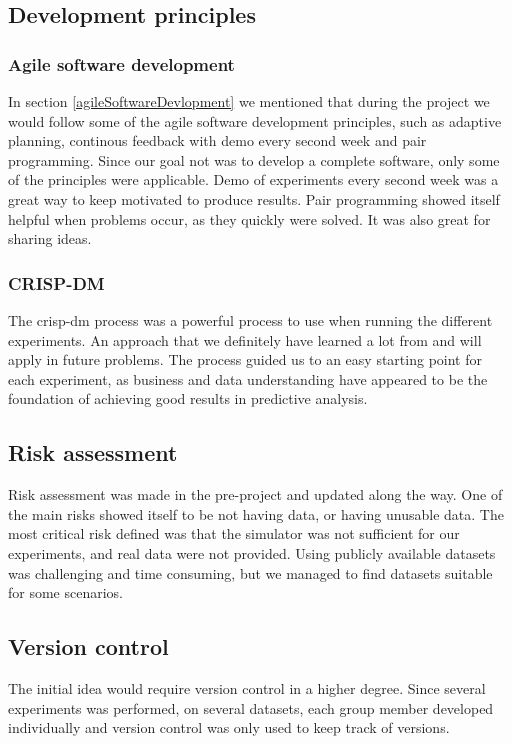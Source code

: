 \documentclass[english, a4paper]{report}
\begin{document}
{{        \subsection{Development principles}
        {
            \subsubsection{Agile software development}
            {
                In section \ref{agileSoftwareDevlopment} we mentioned that during the project we would follow some of the agile software development principles, such as adaptive planning, continous feedback with demo every second week and pair programming. Since our goal not was to develop a complete software, only some of the principles were applicable. Demo of experiments every second week was a great way to keep motivated to produce results. Pair programming showed itself helpful when problems occur, as they quickly were solved. It was also great for sharing ideas. 
            }
            
            \subsubsection{CRISP-DM}
            {
                The \gls{crisp-dm} process was a powerful process to use when running the different experiments. An approach that we definitely have learned a lot from and will apply in future problems. The process guided us to an easy starting point for each experiment, as business and data understanding have appeared to be the foundation of achieving good results in predictive analysis. 
            }
        }
        
        \subsection{Risk assessment}
        {
            Risk assessment was made in the pre-project and updated along the way. One of the main risks showed itself to be not having data, or having unusable data. The most critical risk defined was that the simulator was not sufficient for our experiments, and real data were not provided. Using publicly available datasets was challenging and time consuming, but we managed to find datasets suitable for some scenarios. 
        }
        
        \subsection{Version control}
        {
            The initial idea would require version control in a higher degree. Since several experiments was performed, on several datasets, each group member developed individually and version control was only used to keep track of versions.
        }
    }
}
\end{document}
